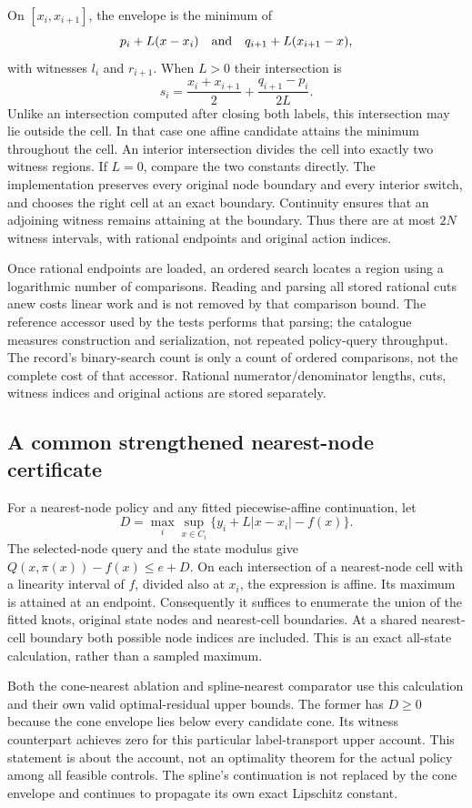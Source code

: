 On $[x_i,x_{i+1}]$, the envelope is the minimum of
\[
 p_i+L(x-x_i)\quad\hbox{and}\quad
 q_{i+1}+L(x_{i+1}-x),
\]
with witnesses $l_i$ and $r_{i+1}$. When $L>0$ their intersection is
\[
 s_i=\frac{x_i+x_{i+1}}2+\frac{q_{i+1}-p_i}{2L}.
\]
Unlike an intersection computed after closing both labels, this intersection may lie outside the cell. In that case one affine candidate attains the minimum throughout the cell. An interior intersection divides the cell into exactly two witness regions. If $L=0$, compare the two constants directly. The implementation preserves every original node boundary and every interior switch, and chooses the right cell at an exact boundary. Continuity ensures that an adjoining witness remains attaining at the boundary. Thus there are at most $2N$ witness intervals, with rational endpoints and original action indices.

Once rational endpoints are loaded, an ordered search locates a region using a logarithmic number of comparisons. Reading and parsing all stored rational cuts anew costs linear work and is not removed by that comparison bound. The reference accessor used by the tests performs that parsing; the catalogue measures construction and serialization, not repeated policy-query throughput. The record's binary-search count is only a count of ordered comparisons, not the complete cost of that accessor. Rational numerator/denominator lengths, cuts, witness indices and original actions are stored separately.

\subsection{A common strengthened nearest-node certificate}
For a nearest-node policy and any fitted piecewise-affine continuation, let
\[
 D=\max_i\sup_{x\in C_i}\{y_i+L|x-x_i|-f(x)\}.
\]
The selected-node query and the state modulus give $Q(x,\pi(x))-f(x)\le e+D$. On each intersection of a nearest-node cell with a linearity interval of $f$, divided also at $x_i$, the expression is affine. Its maximum is attained at an endpoint. Consequently it suffices to enumerate the union of the fitted knots, original state nodes and nearest-cell boundaries. At a shared nearest-cell boundary both possible node indices are included. This is an exact all-state calculation, rather than a sampled maximum.

Both the cone-nearest ablation and spline-nearest comparator use this calculation and their own valid optimal-residual upper bounds. The former has $D\ge0$ because the cone envelope lies below every candidate cone. Its witness counterpart achieves zero for this particular label-transport upper account. This statement is about the account, not an optimality theorem for the actual policy among all feasible controls. The spline's continuation is not replaced by the cone envelope and continues to propagate its own exact Lipschitz constant.

